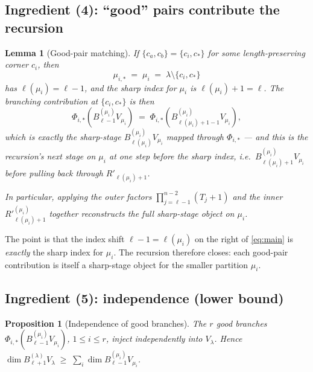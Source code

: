 \documentclass[11pt]{article}
\newtheorem{lemma}[theorem]{Lemma}
\newtheorem{proposition}[theorem]{Proposition}
\theoremstyle{definition}
\begin{document}
\subsection{Ingredient (4): ``good'' pairs contribute the recursion}

\begin{lemma}[Good-pair matching]\label{lem:good-match}
If $\{c_a, c_b\} = \{c_i, c_*\}$ for some length-preserving corner $c_i$,
then
\[
   \mu_{i, *} \;=\; \mu_i \;=\; \lambda \setminus \{c_i, c_*\}
\]
has $\ell(\mu_i) = \ell - 1$, and the sharp index for $\mu_i$ is
$\ell(\mu_i) + 1 = \ell$. The branching contribution at $\{c_i, c_*\}$
is then
\[
   \Phi_{i, *}\!\left(B_{\ell - 1}^{(\mu_i)} V_{\mu_i}\right)
   \;=\;
   \Phi_{i, *}\!\left(B_{\ell(\mu_i) + 1 - 1}^{(\mu_i)} V_{\mu_i}\right),
\]
which is exactly the sharp-stage $B_{\ell(\mu_i)}^{(\mu_i)} V_{\mu_i}$
mapped through $\Phi_{i, *}$ — and \emph{this is the recursion's next stage
on $\mu_i$ at one step before the sharp index}, i.e.\
$B_{\ell(\mu_i) + 1}^{(\mu_i)} V_{\mu_i}$ before pulling back through $R'_{\ell(\mu_i) + 1}$.

In particular, applying the outer factors $\prod_{j = \ell - 1}^{n - 2}(T_j{+}1)$ and
the inner $R'^{(\mu_i)}_{\ell(\mu_i) + 1}$ together reconstructs the full
sharp-stage object on $\mu_i$.
\end{lemma}

\noindent The point is that the index shift $\ell - 1 = \ell(\mu_i)$ on the
right of \eqref{eq:main} is \emph{exactly} the sharp index for $\mu_i$.
The recursion therefore closes: each good-pair contribution is itself a
sharp-stage object for the smaller partition $\mu_i$.

\subsection{Ingredient (5): independence (lower bound)}

\begin{proposition}[Independence of good branches]\label{prop:indep}
The $r$ good branches $\Phi_{i, *}(B_{\ell-1}^{(\mu_i)} V_{\mu_i})$,
$1 \le i \le r$, inject independently into $V_\lambda$. Hence
$\dim B_{\ell+1}^{(\lambda)} V_\lambda \;\ge\; \sum_i \dim B_{\ell-1}^{(\mu_i)} V_{\mu_i}$.
\end{proposition}
\end{document}
